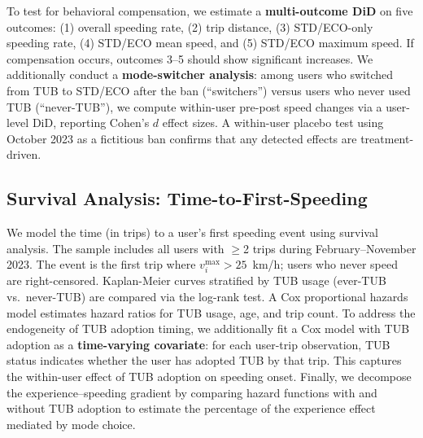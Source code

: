To test for behavioral compensation, we estimate a \textbf{multi-outcome DiD} on five outcomes: (1) overall speeding rate, (2) trip distance, (3) STD/ECO-only speeding rate, (4) STD/ECO mean speed, and (5) STD/ECO maximum speed. If compensation occurs, outcomes 3--5 should show significant increases. We additionally conduct a \textbf{mode-switcher analysis}: among users who switched from TUB to STD/ECO after the ban (``switchers'') versus users who never used TUB (``never-TUB''), we compute within-user pre-post speed changes via a user-level DiD, reporting Cohen's $d$ effect sizes. A within-user placebo test using October 2023 as a fictitious ban confirms that any detected effects are treatment-driven.

\subsection{Survival Analysis: Time-to-First-Speeding}
\label{sec:meth_survival}

We model the time (in trips) to a user's first speeding event using survival analysis. The sample includes all users with $\geq$2 trips during February--November 2023. The event is the first trip where $v_i^{\max} > 25$~km/h; users who never speed are right-censored. Kaplan-Meier curves stratified by TUB usage (ever-TUB vs.\ never-TUB) are compared via the log-rank test. A Cox proportional hazards model estimates hazard ratios for TUB usage, age, and trip count. To address the endogeneity of TUB adoption timing, we additionally fit a Cox model with TUB adoption as a \textbf{time-varying covariate}: for each user-trip observation, TUB status indicates whether the user has adopted TUB by that trip. This captures the within-user effect of TUB adoption on speeding onset. Finally, we decompose the experience--speeding gradient by comparing hazard functions with and without TUB adoption to estimate the percentage of the experience effect mediated by mode choice.

